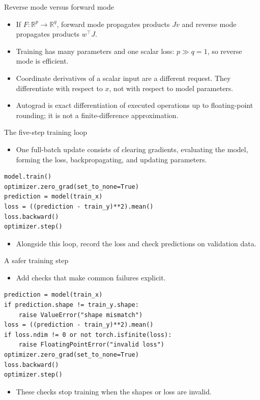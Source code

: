 \documentclass[aspectratio=43,11pt]{beamer}
\newcommand{\slideid}{L2}
\newcommand{\R}{\mathbb{R}}
\newenvironment{slideitems}{\small\begin{itemize}\setlength\itemsep{0.45em}}{\end{itemize}}
\begin{document}
\renewcommand{\slideid}{L2-S58}
\begin{frame}[t]{Reverse mode versus forward mode}
\begin{slideitems}
\item If $F:\R^p\to\R^q$, forward mode propagates products $Jv$ and reverse mode propagates products $w^\top J$.
\item Training has many parameters and one scalar loss: $p\gg q=1$, so reverse mode is efficient.
\item Coordinate derivatives of a scalar input are a different request. They differentiate with respect to $x$, not with respect to model parameters.
\item Autograd is exact differentiation of executed operations up to floating-point rounding; it is not a finite-difference approximation.
\end{slideitems}
\end{frame}

\renewcommand{\slideid}{L2-S59}
\begin{frame}[fragile,t]{The five-step training loop}
\begin{slideitems}
\item One full-batch update consists of clearing gradients, evaluating the model, forming the loss, backpropagating, and updating parameters.
\end{slideitems}
\begin{lstlisting}
model.train()
optimizer.zero_grad(set_to_none=True)
prediction = model(train_x)
loss = ((prediction - train_y)**2).mean()
loss.backward()
optimizer.step()
\end{lstlisting}
\begin{slideitems}
\item Alongside this loop, record the loss and check predictions on validation data.
\end{slideitems}
\end{frame}

\renewcommand{\slideid}{L2-S60}
\begin{frame}[fragile,t]{A safer training step}
\begin{slideitems}
\item Add checks that make common failures explicit.
\end{slideitems}
\begin{lstlisting}
prediction = model(train_x)
if prediction.shape != train_y.shape:
    raise ValueError("shape mismatch")
loss = ((prediction - train_y)**2).mean()
if loss.ndim != 0 or not torch.isfinite(loss):
    raise FloatingPointError("invalid loss")
optimizer.zero_grad(set_to_none=True)
loss.backward()
optimizer.step()
\end{lstlisting}
\begin{slideitems}
\item These checks stop training when the shapes or loss are invalid.
\end{slideitems}
\end{frame}
\end{document}
